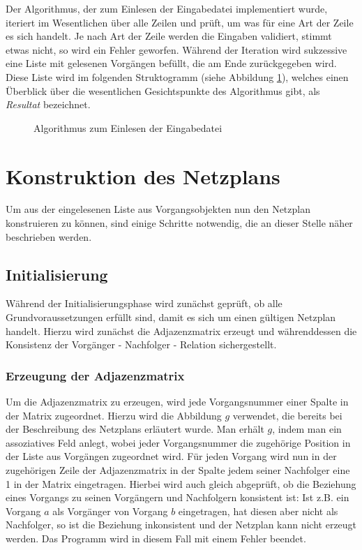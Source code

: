 Der Algorithmus, der zum Einlesen der Eingabedatei implementiert
wurde, iteriert im Wesentlichen \"uber alle Zeilen und pr\"uft, um was
f\"ur eine Art der Zeile es sich handelt. Je nach Art der Zeile werden
die Eingaben validiert, stimmt etwas nicht, so wird ein Fehler
geworfen. W\"ahrend der Iteration wird sukzessive eine Liste mit
gelesenen Vorg\"angen bef\"ullt, die am Ende zur\"uckgegeben
wird. Diese Liste wird im folgenden Struktogramm (siehe Abbildung \ref{einlesen}), welches einen
\"Uberblick \"uber die wesentlichen Gesichtspunkte des Algorithmus
gibt, als \textit{Resultat} bezeichnet.
\begin{figure}[h]
  
  \caption{Algorithmus zum Einlesen der Eingabedatei}
  \label{einlesen}
\end{figure}

\section{Konstruktion des Netzplans}

Um aus der eingelesenen Liste aus Vorgangsobjekten nun den Netzplan
konstruieren zu k\"onnen, sind einige Schritte notwendig, die an
dieser Stelle n\"aher beschrieben werden.

\subsection{Initialisierung}

W\"ahrend der Initialisierungsphase wird zun\"achst gepr\"uft, ob alle
Grundvoraussetzungen erf\"ullt sind, damit es sich um einen g\"ultigen
Netzplan handelt. Hierzu wird zun\"achst die Adjazenzmatrix erzeugt
und w\"ahrenddessen die Konsistenz der Vorg\"anger - Nachfolger -
Relation sichergestellt.

\subsubsection{Erzeugung der Adjazenzmatrix}

Um die Adjazenzmatrix zu erzeugen, wird jede Vorgangsnummer einer
Spalte in der Matrix zugeordnet. Hierzu wird die Abbildung \(g\)
verwendet, die bereits bei der Beschreibung des Netzplans erl\"autert
wurde. Man erh\"alt \(g\), indem man ein assoziatives Feld anlegt,
wobei jeder Vorgangsnummer die zugeh\"orige Position in der Liste aus
Vorg\"angen zugeordnet wird.
F\"ur jeden Vorgang wird nun in der zugeh\"origen Zeile der
Adjazenzmatrix in der Spalte
jedem seiner Nachfolger eine 1 in der Matrix eingetragen. Hierbei wird
auch gleich abgepr\"uft, ob die Beziehung eines Vorgangs zu seinen
Vorg\"angern und Nachfolgern konsistent ist: Ist z.B. ein Vorgang \(a\) als
Vorg\"anger von Vorgang \(b\) eingetragen, hat diesen aber nicht als
Nachfolger, so ist die Beziehung inkonsistent und der Netzplan kann
nicht erzeugt werden. Das Programm wird in diesem Fall mit einem
Fehler beendet.

